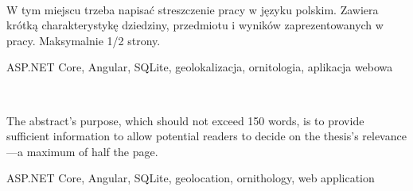 %


\begin{center}
\\[1cm] 
\end{center}

W tym miejscu trzeba napisać streszczenie pracy w języku polskim. Zawiera krótką charakterystykę dziedziny, przedmiotu i wyników zaprezentowanych w pracy. Maksymalnie 1/2 strony.

\vspace{10pt}
 ASP.NET Core, Angular, SQLite, geolokalizacja, ornitologia, aplikacja webowa

\vfill

\begin{center}
\\[1cm] 
\end{center}
The abstract's purpose, which should not exceed 150 words, is to provide sufficient information to allow potential readers to decide on the thesis's relevance—a maximum of half the page.

\vspace{10pt}
 ASP.NET Core, Angular, SQLite, geolocation, ornithology, web application